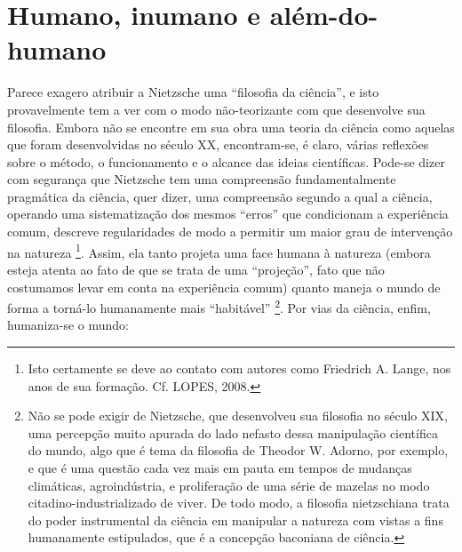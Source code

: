 \documentclass[
	12pt,				%
	openright,			%
	oneside,			%
	a4paper,			%
	english,			%
	french,				%
	spanish,			%
	brazil				%
	]{abntex2}
\begin{document}
\section{Humano, inumano e além-do-humano}

Parece exagero atribuir a Nietzsche uma “filosofia da ciência”, e isto provavelmente tem a ver com o modo não-teorizante com que desenvolve sua filosofia. Embora não se encontre em sua obra uma teoria da ciência como aquelas que foram desenvolvidas no século XX, encontram-se, é claro, várias reflexões sobre o método, o funcionamento e o alcance das ideias científicas. Pode-se dizer com segurança que Nietzsche tem uma compreensão fundamentalmente pragmática da ciência, quer dizer, uma compreensão segundo a qual a ciência, operando uma sistematização dos mesmos “erros” que condicionam a experiência comum, descreve regularidades de modo a permitir um maior grau de intervenção na natureza
\footnote{Isto certamente se deve ao contato com autores como Friedrich A. Lange, nos anos de sua formação. Cf. LOPES, 2008.}. Assim, ela tanto projeta uma face humana à natureza (embora esteja atenta ao fato de que se trata de uma “projeção”, fato que não costumamos levar em conta na experiência comum) quanto maneja o mundo de forma a torná-lo humanamente mais “habitável”
\footnote{Não se pode exigir de Nietzsche, que desenvolveu sua filosofia no século XIX, uma percepção muito apurada do lado nefasto dessa manipulação científica do mundo, algo que é tema da filosofia de Theodor W. Adorno, por exemplo, e que é uma questão cada vez mais em pauta em tempos de mudanças climáticas, agroindústria, e proliferação de uma série de mazelas no modo citadino-industrializado de viver. De todo modo, a filosofia nietzschiana trata do poder instrumental da ciência em manipular a natureza com vistas a fins humanamente estipulados, que é a concepção baconiana de ciência.}. Por vias da ciência, enfim, humaniza-se o mundo:
\end{document}
